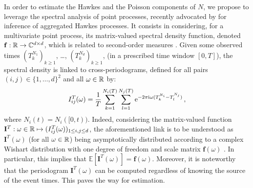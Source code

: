         In order to estimate the Hawkes and the Poisson components of $N$,
        we propose to leverage the spectral analysis of point processes,
        recently advocated by \textcite{Cheysson2022} for inference of aggregated Hawkes processes.        
        It consists in considering, for a multivariate point process, its matrix-valued spectral density function, denoted $\mathbf f : {\mathbb R} \to \mathbb C^{d \times d}$,
        which is related to second-order measures \parencite{Bartlett1963}.
        Given some observed
        times $(T_k^{N_1})_{k\ge1}$, \dots, $(T_k^{N_d})_{k\ge1}$,
        (in a prescribed time window $[0, T]$),
        the spectral density is linked to cross-periodograms,
        defined for all pairs $(i, j) \in \{1, \dots, d\}^2$ and all $\omega \in {\mathbb R}$ by:
        \begin{equation}\label{eq:chap4_multivariate_periodogram}
          I_{ij}^T(\omega) = \frac{1}{T}\sum_{k=1}^{N_i(T)}\sum_{l=1}^{N_j(T)}\mathrm{e}^{-2 \pi \mathrm{i} \omega (T_k^{N_i} - T_l^{N_j})}\,,
        \end{equation}
        where $N_i(t) = N_i([0, t))$.
        Indeed, considering the matrix-valued function $\mathbf I^T : \omega \in {\mathbb R} \mapsto (I_{ij}^T(\omega))_{1 \le i, j \le d}$,
        the aforementioned link is to be understood as $\mathbf I^T(\omega)$ (for all $\omega \in{\mathbb R}$) being asymptotically distributed according to a complex Wishart distribution with one degree of freedom and scale matrix $\mathbf f(\omega)$ \parencite{Tuan1981, Villani2022}.
        In particular, this implies that \(\mathbb E [\mathbf I^T(\omega)] = \mathbf f(\omega)\).
        Moreover, it is noteworthy that the periodogram $\mathbf I^T(\omega)$ can be computed regardless of knowing the source of the event times.
        This paves the way for estimation.
        
